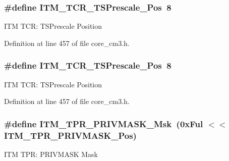 \subsubsection[{\texorpdfstring{I\+T\+M\+\_\+\+T\+C\+R\+\_\+\+T\+S\+Prescale\+\_\+\+Pos}{ITM_TCR_TSPrescale_Pos}}]{\setlength{\rightskip}{0pt plus 5cm}\#define I\+T\+M\+\_\+\+T\+C\+R\+\_\+\+T\+S\+Prescale\+\_\+\+Pos~8}\hypertarget{group___c_m_s_i_s___c_m3___i_t_m_gad7bc9ee1732032c6e0de035f0978e473}{}\label{group___c_m_s_i_s___c_m3___i_t_m_gad7bc9ee1732032c6e0de035f0978e473}
I\+TM T\+CR\+: T\+S\+Prescale Position 

Definition at line 457 of file core\+\_\+cm3.\+h.

\subsubsection[{\texorpdfstring{I\+T\+M\+\_\+\+T\+C\+R\+\_\+\+T\+S\+Prescale\+\_\+\+Pos}{ITM_TCR_TSPrescale_Pos}}]{\setlength{\rightskip}{0pt plus 5cm}\#define I\+T\+M\+\_\+\+T\+C\+R\+\_\+\+T\+S\+Prescale\+\_\+\+Pos~8}\hypertarget{group___c_m_s_i_s___c_m3___i_t_m_gad7bc9ee1732032c6e0de035f0978e473}{}\label{group___c_m_s_i_s___c_m3___i_t_m_gad7bc9ee1732032c6e0de035f0978e473}
I\+TM T\+CR\+: T\+S\+Prescale Position 

Definition at line 457 of file core\+\_\+cm3.\+h.

\subsubsection[{\texorpdfstring{I\+T\+M\+\_\+\+T\+P\+R\+\_\+\+P\+R\+I\+V\+M\+A\+S\+K\+\_\+\+Msk}{ITM_TPR_PRIVMASK_Msk}}]{\setlength{\rightskip}{0pt plus 5cm}\#define I\+T\+M\+\_\+\+T\+P\+R\+\_\+\+P\+R\+I\+V\+M\+A\+S\+K\+\_\+\+Msk~(0x\+Ful $<$$<$ I\+T\+M\+\_\+\+T\+P\+R\+\_\+\+P\+R\+I\+V\+M\+A\+S\+K\+\_\+\+Pos)}\hypertarget{group___c_m_s_i_s___c_m3___i_t_m_ga168e089d882df325a387aab3a802a46b}{}\label{group___c_m_s_i_s___c_m3___i_t_m_ga168e089d882df325a387aab3a802a46b}
I\+TM T\+PR\+: P\+R\+I\+V\+M\+A\+SK Mask 

